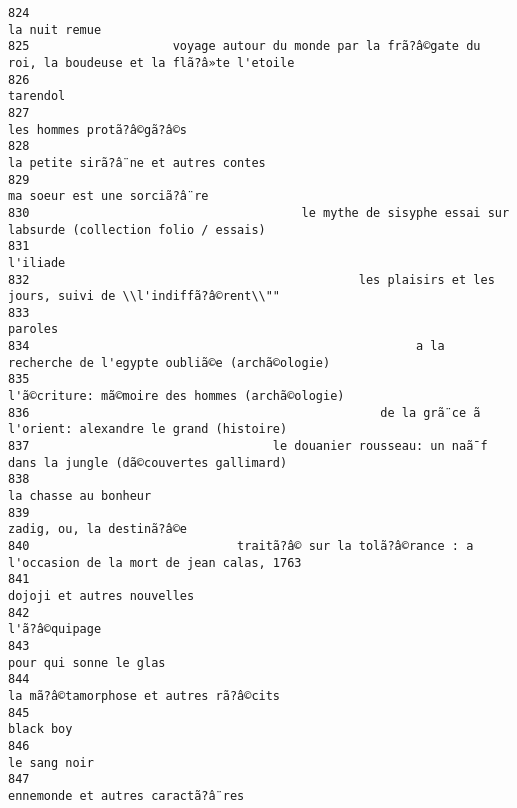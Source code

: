 \documentclass[
]{report}
\begin{document}
\begin{verbatim}
824                                                                                           la nuit remue
825                    voyage autour du monde par la frã?â©gate du roi, la boudeuse et la flã?â»te l'etoile
826                                                                                                tarendol
827                                                                               les hommes protã?â©gã?â©s
828                                                                    la petite sirã?â¨ne et autres contes
829                                                                            ma soeur est une sorciã?â¨re
830                                      le mythe de sisyphe essai sur labsurde (collection folio / essais)
831                                                                                                l'iliade
832                                              les plaisirs et les jours, suivi de \\l'indiffã?â©rent\\""
833                                                                                                 paroles
834                                                      a la recherche de l'egypte oubliã©e (archã©ologie)
835                                                         l'ã©criture: mã©moire des hommes (archã©ologie)
836                                                 de la grã¨ce ã  l'orient: alexandre le grand (histoire)
837                                  le douanier rousseau: un naã¯f dans la jungle (dã©couvertes gallimard)
838                                                                                    la chasse au bonheur
839                                                                               zadig, ou, la destinã?â©e
840                             traitã?â© sur la tolã?â©rance : a l'occasion de la mort de jean calas, 1763
841                                                                              dojoji et autres nouvelles
842                                                                                           l'ã?â©quipage
843                                                                                  pour qui sonne le glas
844                                                                  la mã?â©tamorphose et autres rã?â©cits
845                                                                                               black boy
846                                                                                            le sang noir
847                                                                       ennemonde et autres caractã?â¨res

\end{verbatim}
\end{document}
